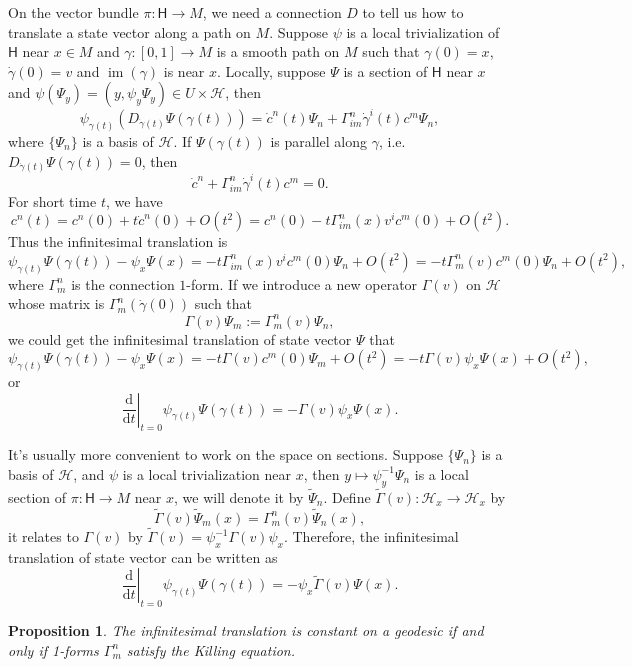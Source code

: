 \documentclass[12pt]{extarticle}
\theoremstyle{definition}
\theoremstyle{plain}
\newtheorem{pro}[para]{Proposition}
\begin{document}
On the vector bundle $\pi:\mathsf H\to M$, we need a connection $D$ to tell us how to translate a state vector along a path on $M$. Suppose $\psi$ is a local trivialization of $\mathsf H$ near $x\in M$ and $\gamma:[0,1]\to M$ is a smooth path on $M$ such that $\gamma(0)=x$, $\dot\gamma(0)=v$ and $\operatorname{im}(\gamma)$ is near $x$. Locally, suppose $\Psi$ is a section of $\mathsf H$ near $x$ and $\psi(\Psi_y)=(y,\psi_y\Psi_y)\in U\times \mathcal H$, then
\[
	\psi_{\gamma(t)}\left(D_{\dot\gamma(t)}\Psi(\gamma(t))\right)=\dot c^n(t)\Psi_n+\Gamma_{im}^n\dot\gamma^i(t)c^m\Psi_n,
\]
where $\{\Psi_n\}$ is a basis of $\mathcal H$. If $\Psi(\gamma(t))$ is parallel along $\gamma$, i.e. $D_{\dot\gamma(t)}\Psi(\gamma(t))=0$, then
\[
	\dot c^n+\Gamma_{im}^n\dot\gamma^i(t)c^m=0.
\]
For short time $t$, we have
\[
	c^n(t)=c^n(0)+t\dot c^n(0)+O(t^2)=c^n(0)-t\Gamma_{im}^n(x)v^i c^m(0)+O(t^2).
\]
Thus the infinitesimal translation is
\[
	\psi_{\gamma(t)}\Psi(\gamma(t))-\psi_{x}\Psi(x)=-t\Gamma_{im}^n(x)v^i c^m(0)\Psi_n+O(t^2)=-t\Gamma_{m}^n(v)c^m(0)\Psi_n+O(t^2),
\]
where $\Gamma^n_m$ is the connection $1$-form. If we introduce a new operator $\Gamma(v)$ on $\mathcal H$ whose matrix is $\Gamma_{m}^n(\dot\gamma(0))$ such that
\[
	\Gamma(v)\Psi_m:=\Gamma_{m}^n(v)\Psi_n,
\]
we could get the infinitesimal translation of state vector $\Psi$ that
\[
	\psi_{\gamma(t)}\Psi(\gamma(t))-\psi_{x}\Psi(x)=-t\Gamma(v)c^m(0)\Psi_m+O(t^2)=-t\Gamma(v) \psi_{x}\Psi(x)+O(t^2),
\]
or
\[
	\left. \frac{\mathrm d}{\mathrm dt}\right|_{t=0}\psi_{\gamma(t)}\Psi(\gamma(t))=-\Gamma(v) \psi_{x}\Psi(x).
\]

It's usually more convenient to work on the space on sections. Suppose $\{\Psi_n\}$ is a basis of $\mathcal H$, and $\psi$ is a local trivialization near $x$, then $y\mapsto \psi_y^{-1}\Psi_n$ is a local section of $\pi:\mathsf H\to M$ near $x$, we will denote it by $\widetilde \Psi_n$. Define $\widetilde\Gamma(v):\mathcal H_x\to \mathcal H_x$ by
\[
	\widetilde\Gamma(v)\widetilde \Psi_m(x)=\Gamma^n_m(v)\widetilde \Psi_n(x),
\]
it relates to $\Gamma(v)$ by $\widetilde\Gamma(v)=\psi_x^{-1}\Gamma(v)\psi_x$. Therefore, the infinitesimal translation of state vector can be written as
\[
	\left. \frac{\mathrm d}{\mathrm dt}\right|_{t=0}\psi_{\gamma(t)}\Psi(\gamma(t))=- \psi_{x}\widetilde\Gamma(v)\Psi(x).
\]

\begin{pro}\label{pro:1}
	The infinitesimal translation is constant on a geodesic if and only if 1-forms $\Gamma^n_m$ satisfy the Killing equation.
\end{pro}
\end{document}
